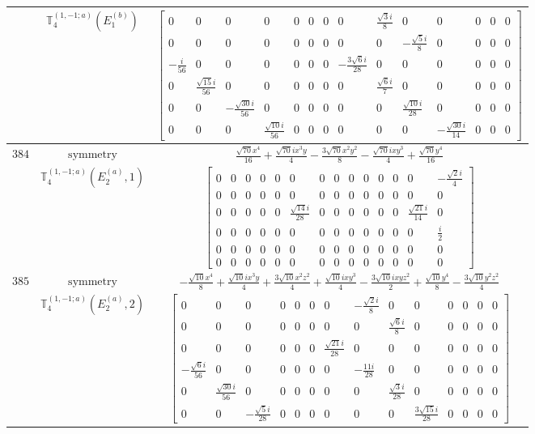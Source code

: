 \documentclass[fleqn,8pt,landscape]{jsarticle}
\begin{document}
\begin{longtable}{ccc}
$  $ & $ \mathbb{T}_{4}^{(1,-1;a)}(E_{1}^{(b)}) $ & $ \begin{bmatrix} 0 & 0 & 0 & 0 & 0 & 0 & 0 & 0 & \frac{\sqrt{3} i}{8} & 0 & 0 & 0 & 0 & 0 \\ 0 & 0 & 0 & 0 & 0 & 0 & 0 & 0 & 0 & - \frac{\sqrt{5} i}{8} & 0 & 0 & 0 & 0 \\ - \frac{i}{56} & 0 & 0 & 0 & 0 & 0 & 0 & - \frac{3 \sqrt{6} i}{28} & 0 & 0 & 0 & 0 & 0 & 0 \\ 0 & \frac{\sqrt{15} i}{56} & 0 & 0 & 0 & 0 & 0 & 0 & \frac{\sqrt{6} i}{7} & 0 & 0 & 0 & 0 & 0 \\ 0 & 0 & - \frac{\sqrt{30} i}{56} & 0 & 0 & 0 & 0 & 0 & 0 & \frac{\sqrt{10} i}{28} & 0 & 0 & 0 & 0 \\ 0 & 0 & 0 & \frac{\sqrt{10} i}{56} & 0 & 0 & 0 & 0 & 0 & 0 & - \frac{\sqrt{30} i}{14} & 0 & 0 & 0 \end{bmatrix} $ \\ \hline
$ 384 $ & $ \text{symmetry} $ & $ \frac{\sqrt{70} x^{4}}{16} + \frac{\sqrt{70} i x^{3} y}{4} - \frac{3 \sqrt{70} x^{2} y^{2}}{8} - \frac{\sqrt{70} i x y^{3}}{4} + \frac{\sqrt{70} y^{4}}{16} $ \\
$  $ & $ \mathbb{T}_{4}^{(1,-1;a)}(E_{2}^{(a)},1) $ & $ \begin{bmatrix} 0 & 0 & 0 & 0 & 0 & 0 & 0 & 0 & 0 & 0 & 0 & 0 & 0 & - \frac{\sqrt{2} i}{4} \\ 0 & 0 & 0 & 0 & 0 & 0 & 0 & 0 & 0 & 0 & 0 & 0 & 0 & 0 \\ 0 & 0 & 0 & 0 & 0 & \frac{\sqrt{14} i}{28} & 0 & 0 & 0 & 0 & 0 & 0 & \frac{\sqrt{21} i}{14} & 0 \\ 0 & 0 & 0 & 0 & 0 & 0 & 0 & 0 & 0 & 0 & 0 & 0 & 0 & \frac{i}{2} \\ 0 & 0 & 0 & 0 & 0 & 0 & 0 & 0 & 0 & 0 & 0 & 0 & 0 & 0 \\ 0 & 0 & 0 & 0 & 0 & 0 & 0 & 0 & 0 & 0 & 0 & 0 & 0 & 0 \end{bmatrix} $ \\ \hline
$ 385 $ & $ \text{symmetry} $ & $ - \frac{\sqrt{10} x^{4}}{8} + \frac{\sqrt{10} i x^{3} y}{4} + \frac{3 \sqrt{10} x^{2} z^{2}}{4} + \frac{\sqrt{10} i x y^{3}}{4} - \frac{3 \sqrt{10} i x y z^{2}}{2} + \frac{\sqrt{10} y^{4}}{8} - \frac{3 \sqrt{10} y^{2} z^{2}}{4} $ \\
$  $ & $ \mathbb{T}_{4}^{(1,-1;a)}(E_{2}^{(a)},2) $ & $ \begin{bmatrix} 0 & 0 & 0 & 0 & 0 & 0 & 0 & - \frac{\sqrt{2} i}{8} & 0 & 0 & 0 & 0 & 0 & 0 \\ 0 & 0 & 0 & 0 & 0 & 0 & 0 & 0 & \frac{\sqrt{6} i}{8} & 0 & 0 & 0 & 0 & 0 \\ 0 & 0 & 0 & 0 & 0 & 0 & \frac{\sqrt{21} i}{28} & 0 & 0 & 0 & 0 & 0 & 0 & 0 \\ - \frac{\sqrt{6} i}{56} & 0 & 0 & 0 & 0 & 0 & 0 & - \frac{11 i}{28} & 0 & 0 & 0 & 0 & 0 & 0 \\ 0 & \frac{\sqrt{30} i}{56} & 0 & 0 & 0 & 0 & 0 & 0 & \frac{\sqrt{3} i}{28} & 0 & 0 & 0 & 0 & 0 \\ 0 & 0 & - \frac{\sqrt{5} i}{28} & 0 & 0 & 0 & 0 & 0 & 0 & \frac{3 \sqrt{15} i}{28} & 0 & 0 & 0 & 0 \end{bmatrix} $ \\ \hline

\end{longtable}
\end{document}
